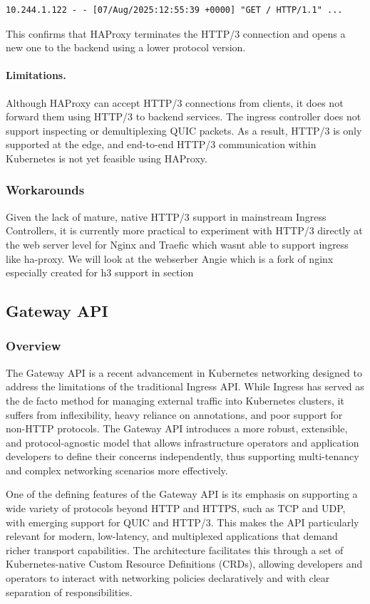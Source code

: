 \begin{verbatim}
10.244.1.122 - - [07/Aug/2025:12:55:39 +0000] "GET / HTTP/1.1" ...
\end{verbatim}

This confirms that HAProxy terminates the HTTP/3 connection and opens a new one to the backend using a lower protocol version.

\paragraph{Limitations.}
Although HAProxy can accept HTTP/3 connections from clients, it does not forward them using HTTP/3 to backend services. The ingress controller does not support inspecting or demultiplexing QUIC packets. As a result, HTTP/3 is only supported at the edge, and end-to-end HTTP/3 communication within Kubernetes is not yet feasible using HAProxy.



\subsubsection{Workarounds}
Given the lack of mature, native HTTP/3 support in mainstream Ingress Controllers, it is currently more practical to experiment with HTTP/3 directly at the web server level for Nginx and Traefic which wasnt able to support ingress like ha-proxy. We will look at the webserber Angie which is a fork of nginx especially created for h3 support in section

\subsection{Gateway API}
\subsubsection{Overview}
The Gateway API is a recent advancement in Kubernetes networking designed to address the limitations of the traditional Ingress API. While Ingress has served as the de facto method for managing external traffic into Kubernetes clusters, it suffers from inflexibility, heavy reliance on annotations, and poor support for non-HTTP protocols. The Gateway API introduces a more robust, extensible, and protocol-agnostic model that allows infrastructure operators and application developers to define their concerns independently, thus supporting multi-tenancy and complex networking scenarios more effectively.

One of the defining features of the Gateway API is its emphasis on supporting a wide variety of protocols beyond HTTP and HTTPS, such as TCP and UDP, with emerging support for QUIC and HTTP/3. This makes the API particularly relevant for modern, low-latency, and multiplexed applications that demand richer transport capabilities. The architecture facilitates this through a set of Kubernetes-native Custom Resource Definitions (CRDs), allowing developers and operators to interact with networking policies declaratively and with clear separation of responsibilities.


